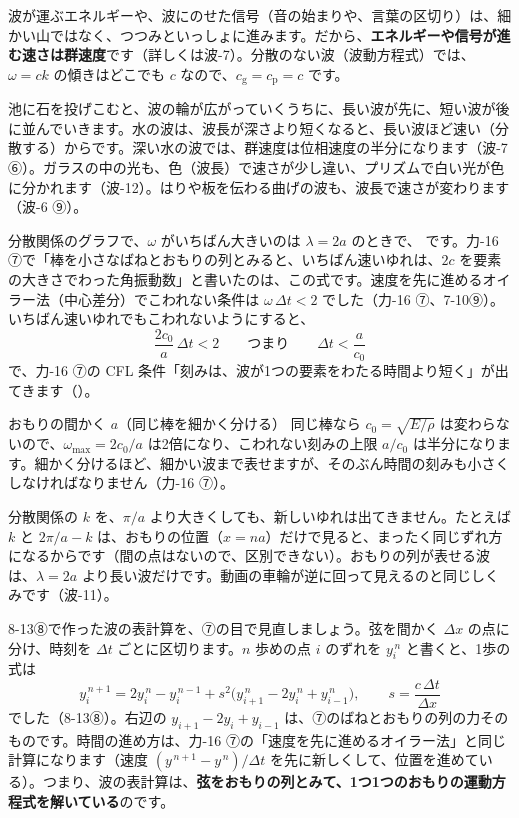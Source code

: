 波が運ぶエネルギーや、波にのせた信号（音の始まりや、言葉の区切り）は、細かい山ではなく、つつみといっしょに進みます。だから、\textbf{エネルギーや信号が進む速さは群速度}です（詳しくは波-7）。分散のない波（波動方程式）では、$\omega=ck$ の傾きはどこでも $c$ なので、$c_{\mathrm g}=c_{\mathrm p}=c$ です。

\begin{phmijika}
池に石を投げこむと、波の輪が広がっていくうちに、長い波が先に、短い波が後に並んでいきます。水の波は、波長が深さより短くなると、長い波ほど速い（分散する）からです。深い水の波では、群速度は位相速度の半分になります（波-7 ⑥）。ガラスの中の光も、色（波長）で速さが少し違い、プリズムで白い光が色に分かれます（波-12）。はりや板を伝わる曲げの波も、波長で速さが変わります（波-6 ⑨）。
\end{phmijika}

分散関係のグラフで、$\omega$ がいちばん大きいのは $\lambda=2a$ のときで、
です。力-16 ⑦で「棒を小さなばねとおもりの列とみると、いちばん速いゆれは、$2c$ を要素の大きさでわった角振動数」と書いたのは、この式です。速度を先に進めるオイラー法（中心差分）でこわれない条件は $\omega\,\Delta t<2$ でした（力-16 ⑦、7-10⑨）。いちばん速いゆれでもこわれないようにすると、
\[\frac{2c_0}{a}\,\Delta t<2\qquad\text{つまり}\qquad\Delta t<\frac{a}{c_0}\]
で、力-16 ⑦の CFL 条件「刻みは、波が1つの要素をわたる時間より短く」が出てきます（）。

\begin{phbaisuru}[半分]{おもりの間かく $a$（同じ棒を細かく分ける）}
同じ棒なら $c_0=\sqrt{E/\rho}$ は変わらないので、$\omega_{\max}=2c_0/a$ は2倍になり、こわれない刻みの上限 $a/c_0$ は半分になります。細かく分けるほど、細かい波まで表せますが、そのぶん時間の刻みも小さくしなければなりません（力-16 ⑦）。
\end{phbaisuru}

\begin{seikaku}
分散関係の $k$ を、$\pi/a$ より大きくしても、新しいゆれは出てきません。たとえば $k$ と $2\pi/a-k$ は、おもりの位置（$x=na$）だけで見ると、まったく同じずれ方になるからです（間の点はないので、区別できない）。おもりの列が表せる波は、$\lambda=2a$ より長い波だけです。動画の車輪が逆に回って見えるのと同じしくみです（波-11）。
\end{seikaku}

\label{ph:波-5:sec8}
8-13⑧で作った波の表計算を、⑦の目で見直しましょう。弦を間かく $\Delta x$ の点に分け、時刻を $\Delta t$ ごとに区切ります。$n$ 歩めの点 $i$ のずれを $y_i^{\,n}$ と書くと、1歩の式は
\[y_i^{\,n+1}=2y_i^{\,n}-y_i^{\,n-1}+s^2\bigl(y_{i+1}^{\,n}-2y_i^{\,n}+y_{i-1}^{\,n}\bigr),\qquad s=\frac{c\,\Delta t}{\Delta x}\]
でした（8-13⑧）。右辺の $y_{i+1}-2y_i+y_{i-1}$ は、⑦のばねとおもりの列の力そのものです。時間の進め方は、力-16 ⑦の「速度を先に進めるオイラー法」と同じ計算になります（速度 $(y^{\,n+1}-y^{\,n})/\Delta t$ を先に新しくして、位置を進めている）。つまり、波の表計算は、\textbf{弦をおもりの列とみて、1つ1つのおもりの運動方程式を解いている}のです。

